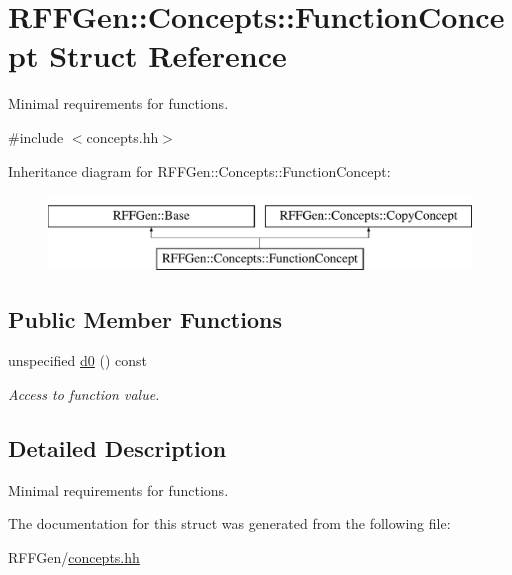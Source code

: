 \hypertarget{structRFFGen_1_1Concepts_1_1FunctionConcept}{\section{R\-F\-F\-Gen\-:\-:Concepts\-:\-:Function\-Concept Struct Reference}
\label{structRFFGen_1_1Concepts_1_1FunctionConcept}
}


Minimal requirements for functions.  




{\ttfamily \#include $<$concepts.\-hh$>$}

Inheritance diagram for R\-F\-F\-Gen\-:\-:Concepts\-:\-:Function\-Concept\-:\begin{figure}[H]
\begin{center}
\leavevmode
\includegraphics[height=2.000000cm]{structRFFGen_1_1Concepts_1_1FunctionConcept}
\end{center}
\end{figure}
\subsection*{Public Member Functions}
\begin{DoxyCompactItemize}
\item 
\hypertarget{structRFFGen_1_1Concepts_1_1FunctionConcept_a6006207e743a93b96d2d603b8b75bd7c}{unspecified \hyperlink{structRFFGen_1_1Concepts_1_1FunctionConcept_a6006207e743a93b96d2d603b8b75bd7c}{d0} () const }\label{structRFFGen_1_1Concepts_1_1FunctionConcept_a6006207e743a93b96d2d603b8b75bd7c}

\begin{DoxyCompactList}\small\item\em Access to function value. \end{DoxyCompactList}\end{DoxyCompactItemize}


\subsection{Detailed Description}
Minimal requirements for functions. 

The documentation for this struct was generated from the following file\-:\begin{DoxyCompactItemize}
\item 
R\-F\-F\-Gen/\hyperlink{concepts_8hh}{concepts.\-hh}\end{DoxyCompactItemize}
